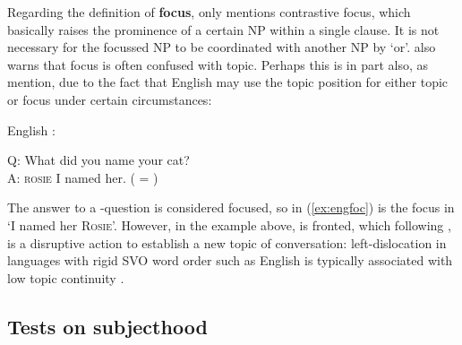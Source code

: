 Regarding the definition of \textbf{focus}, \citet[174]{dixon2010} only
mentions contrastive focus, which basically raises the prominence of a certain
NP within a single clause. It is not necessary for the focussed NP to be
coordinated with another NP by `or'. \citet{dixon2010} also warns that focus
is often confused with topic. Perhaps this is in part also, as
\citet{bresnan2016} mention, due to the fact that English may use the topic
position for either topic or focus under certain circumstances:

\ex\label{ex:engfoc} English \citep[98]{bresnan2016}:\medskip

Q: What did you name your cat?\\
A: \textsc{rosie} I named her. ( = \Foc{})
\xe

The answer to a -question is considered focused, so  in
(\ref{ex:engfoc}) is the focus in `I named her \textsc{Rosie}'. However, in the
example above,  is fronted, which following \citet{givon1983}, is a
disruptive action to establish a new topic of conversation: left-dislocation in
languages with rigid SVO word order such as English is typically associated
with low topic continuity \citep[32]{givon1983}.

\subsection{Tests on subjecthood}

